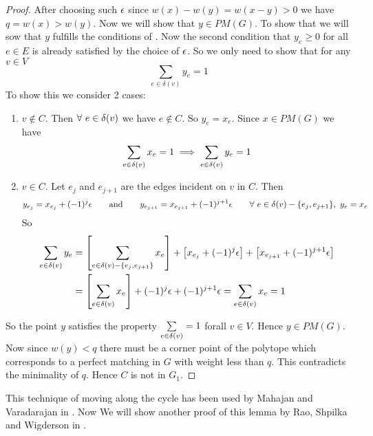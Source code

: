 \begin{proof}
After choosing such $\epsilon$ since $w(x)-w(y)=w(x-y)>0$ we have $q=w(x)>w(y)$. Now we will show that $y\in PM(G)$. To show that we will sow that $y$ fulfills the conditions of . Now the second condition that $y_e\geq 0$ for all $e\in E$ is already satisfied by the choice of $\epsilon$. So we only need to show that for any $v\in V$ $$\sum_{e\in \delta(v)}y_e=1$$To show this we consider 2 cases:
\begin{enumerate}[label=\bfseries Case \arabic*:,leftmargin=1.7cm]
	\item $v\notin C$. Then $\forall \ e\in \delta(v)$ we have $e\notin C$. So $y_e=x_e$. Since $x\in PM(G)$ we have $$\sum_{e\in\delta(v)}x_e=1\implies \sum_{e\in \delta(v)}y_e=1$$
	\item $v\in C$. Let $e_j$ and $e_{j+1}$ are the edges incident on $v$ in $C$. Then $$y_{e_j}=x_{e_j}+(-1)^{j}\eps\qquad \text{and}\qquad y_{e_{j+1}}=x_{e_{j+1}}+(-1)^{j+1}\eps\qquad \forall\ e\in \dl(v)-\{e_{j},e_{j+1}\},\ y_e=x_e$$So\begin{align*}
		\sum_{e\in \delta(v)}y_e & = \left[\sum_{e\in \delta(v)-\{e_j,e_{j+1}\}}x_e\right]+\left[x_{e_j}+(-1)^j\epsilon\right]+\left[x_{e_{j+1}}+(-1)^{j+1}\epsilon\right]\\
		& = \left[\sum_{e\in \delta(v)}x_e\right]+(-1)^j\epsilon+(-1)^{j+1}\epsilon = \sum_{e\in \delta(v)}x_e=1
	\end{align*}
\end{enumerate}
So the point $y$ satisfies the property $\sum\limits_{e\in\delta(v)}=1$ forall $v\in V$. Hence $y\in PM(G)$. Now since $w(y)<q$ there must be a corner point of the polytope which corresponds to a perfect matching in $G$ with weight less than $q$. This contradicts the minimality of $q$. Hence $C$ is not in $G_1$.
\end{proof}
This technique of moving along the cycle has been used by Mahajan and Varadarajan in \cite{MahajanVaradarajan_2000_AnN_CONF}. Now We will show another proof of this lemma by Rao, Shpilka  and Wigderson in \cite{GoldwasserGrossman_2017_BPM}.\vspace*{\baselineskip}


